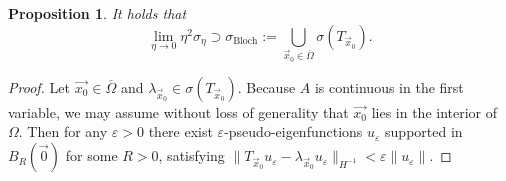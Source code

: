 \documentclass[a4paper,reqno]{amsart}
\numberwithin{equation}{section}
\numberwithin{equation}{section}		%
\numberwithin{figure}{section}			%
\numberwithin{table}{section}				%
\newtheorem{proposition}[theorem]{Proposition}
\theoremstyle{definition}
\renewcommand{\bar}[1]{\overline{#1}}
\newcommand{\<}{\ensuremath \leq}
\renewcommand{\>}{\ensuremath \geq}
\renewcommand{\epsilon}{\varepsilon}
\begin{document}
\begin{proposition}\label{prop: BlochSpectrum}
    It holds that
    \begin{equation}
    \lim_{\eta\rightarrow 0}\eta^{2}\sigma_\eta \supset \sigma_{\text{Bloch}}:= \bigcup_{\vec{x}_0\in \bar{\Omega}}\sigma(T_{\vec{x}_0}).
    \end{equation}
\end{proposition}
\begin{proof}
Let $\vec{x_0}\in\overline{\Omega}$ and $\lambda_{\vec{x}_0}\in\sigma(T_{\vec{x}_0})$. Because $A$ is continuous in the first variable, we may assume without loss of generality that $\vec{x_0}$ lies in the interior of $\Omega$. Then for any $\epsilon>0$ there exist $\epsilon$-pseudo-eigenfunctions $u_\epsilon$ supported in $B_R(\vec{0})$ for some $R>0$, satisfying $\lVert T_{\vec{x}_0}u_\epsilon - \lambda_{\vec{x}_0}u_\epsilon\rVert_{H^{-1}} < \epsilon\lVert u_\epsilon\rVert$.


\end{proof}
\end{document}
